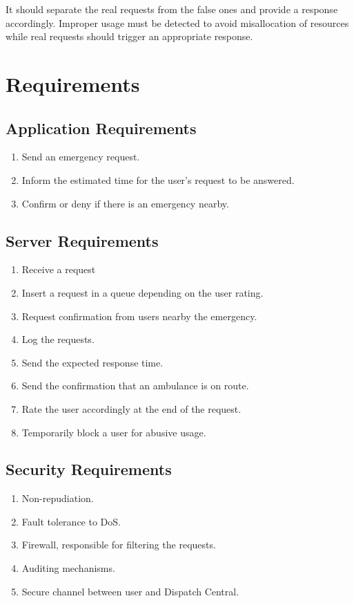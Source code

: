 \documentclass[a4paper,titlepage,11pt]{article}
\begin{document}
It should separate the real requests from the false ones and provide a response accordingly.
Improper usage must be detected to avoid misallocation of resources while real requests should
trigger an appropriate response.

\section{Requirements}

\subsection{Application Requirements}
\begin{enumerate}
  \item Send an emergency request.
  \item Inform the estimated time for the user's request to be answered.
  \item Confirm or deny if there is an emergency nearby.
\end{enumerate}

\subsection{Server Requirements}
\begin{enumerate}
  \item Receive a request
  \item Insert a request in a queue depending on the user rating.
  \item Request confirmation from users nearby the emergency.
  \item Log the requests.
  \item Send the expected response time.
  \item Send the confirmation that an ambulance is on route.
  \item Rate the user accordingly at the end of the request.

  \item Temporarily block a user for abusive usage.
\end{enumerate}

\subsection{Security Requirements}
\begin{enumerate}
  \item Non-repudiation.
  \item Fault tolerance to DoS.
  \item Firewall, responsible for filtering the requests.
  \item Auditing mechanisms.
  \item Secure channel between user and Dispatch Central.
\end{enumerate}
\end{document}
